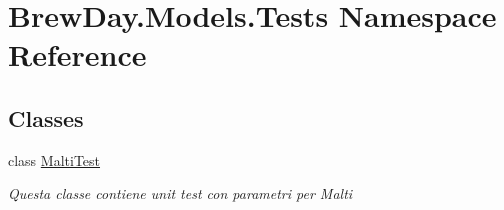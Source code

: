\hypertarget{namespace_brew_day_1_1_models_1_1_tests}{}\section{Brew\+Day.\+Models.\+Tests Namespace Reference}
\label{namespace_brew_day_1_1_models_1_1_tests}
\subsection*{Classes}
\begin{DoxyCompactItemize}
\item 
class \mbox{\hyperlink{class_brew_day_1_1_models_1_1_tests_1_1_malti_test}{Malti\+Test}}
\begin{DoxyCompactList}\small\item\em Questa classe contiene unit test con parametri per Malti\end{DoxyCompactList}\end{DoxyCompactItemize}
